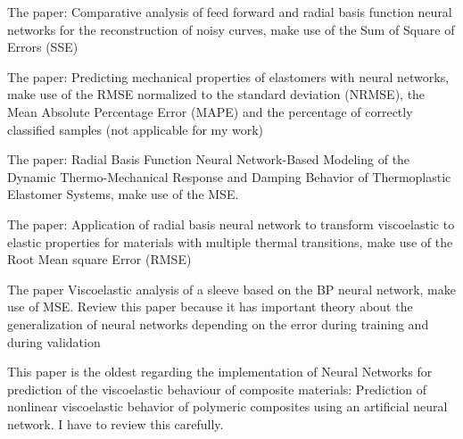 The paper: Comparative analysis of feed forward and radial basis function neural networks for the reconstruction of noisy curves, make use of the Sum of Square of Errors (SSE)

The paper: Predicting mechanical properties of elastomers with neural networks, make use of the RMSE normalized to the standard deviation (NRMSE), the Mean Absolute Percentage Error (MAPE) and the percentage of correctly classified samples (not applicable for my work)

The paper: Radial Basis Function Neural Network-Based Modeling of the Dynamic Thermo-Mechanical Response and Damping Behavior of Thermoplastic Elastomer Systems, make use of the MSE.

The paper: Application of radial basis neural network to transform viscoelastic to elastic properties for materials with multiple thermal transitions, make use of the Root Mean square Error (RMSE)

The paper Viscoelastic analysis of a sleeve based on the BP neural network, make use of MSE. Review this paper because it has important theory about the generalization of neural networks depending on the error during training and during validation

This paper is the oldest regarding the implementation of Neural Networks for prediction of the viscoelastic behaviour of composite materials: Prediction of nonlinear viscoelastic behavior of polymeric composites using an artificial neural network. I have to review this carefully.